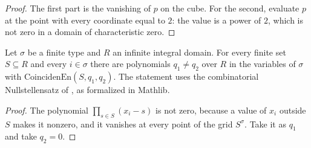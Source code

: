 \begin{proof}
  \leanok
  The first part is the vanishing of $p$ on the cube. For the second, evaluate $p$ at the point with
  every coordinate equal to $2$: the value is a power of $2$, which is not zero in a domain of
  characteristic zero.
\end{proof}

\begin{theorem}
  \label{thm:barriers-ninguna-malla-basta}
  \leanok
  Let $\sigma$ be a finite type and $R$ an infinite integral domain. For every finite set $S
  \subseteq R$ and every $i \in \sigma$ there are polynomials $q_1 \ne q_2$ over $R$ in the
  variables of $\sigma$ with $\mathrm{CoincidenEn}(S, q_1, q_2)$. The statement uses the
  combinatorial Nullstellensatz of \cite{Alon99}, as formalized in Mathlib.
  \own{}
  \exploration{}
\end{theorem}

\begin{proof}
  \leanok
  The polynomial $\prod_{s \in S} (x_i - s)$ is not zero, because a value of $x_i$ outside $S$
  makes it nonzero, and it vanishes at every point of the grid $S^\sigma$. Take it as $q_1$ and take
  $q_2 = 0$.
\end{proof}
